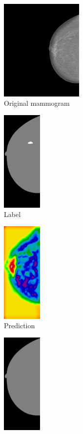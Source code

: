 \begin{figure}[h]
\begin{subfigure}{0.2\textwidth}
	\end{subfigure}%
	\\
	\begin{subfigure}{0.25\textwidth}
		\centering
			\includegraphics[height = 5cm]{plots/mammogram_ex2.png}
		\caption{Original mammogram}
	\end{subfigure}
	\begin{subfigure}{0.2\textwidth}
		\centering
			\includegraphics[height = 5cm]{plots/label_ex2.png}
		\caption{Label}
	\end{subfigure}
	\begin{subfigure}{0.16\textwidth}
		\centering
			\includegraphics[height = 5cm]{plots/logits_ex2_v1.png}
		\caption{Prediction}
	\end{subfigure}
	\begin{subfigure}{0.2\textwidth}
		\centering
			\includegraphics[height = 5cm]{plots/segmentation_ex2_v1.png}

\end{subfigure}
\end{figure}
